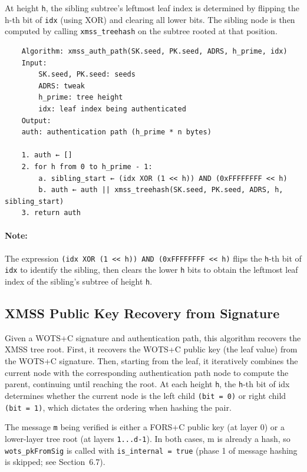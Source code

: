 At height \texttt{h}, the sibling subtree's leftmost leaf index is determined by flipping the h-th bit of \texttt{idx} (using XOR) and clearing all lower bits. The sibling node is then computed by calling \texttt{xmss\_treehash} on the subtree rooted at that position.
\begin{verbatim}
    Algorithm: xmss_auth_path(SK.seed, PK.seed, ADRS, h_prime, idx)
    Input:
        SK.seed, PK.seed: seeds
        ADRS: tweak
        h_prime: tree height
        idx: leaf index being authenticated
    Output:
    auth: authentication path (h_prime * n bytes)

    1. auth ← []
    2. for h from 0 to h_prime - 1:
        a. sibling_start ← (idx XOR (1 << h)) AND (0xFFFFFFFF << h)
        b. auth ← auth || xmss_treehash(SK.seed, PK.seed, ADRS, h, sibling_start)
    3. return auth
\end{verbatim}
\paragraph{Note:} The expression \texttt{(idx XOR (1 << h)) AND (0xFFFFFFFF << h)} flips the \texttt{h}-th bit of \texttt{idx} to identify the sibling, then clears the lower \texttt{h} bits to obtain the leftmost leaf index of the sibling's subtree of height \texttt{h}.

\subsection{XMSS Public Key Recovery from Signature}
Given a WOTS+C signature and authentication path, this algorithm recovers the XMSS tree root. First, it recovers the WOTS+C public key (the leaf value) from the WOTS+C signature. Then, starting from the leaf, it iteratively combines the current node with the corresponding authentication path node to compute the parent, continuing until reaching the root. At each height \texttt{h}, the \texttt{h}-th bit of idx determines whether the current node is the left child \texttt{(bit = 0)} or right child \texttt{(bit = 1)}, which dictates the ordering when hashing the pair.

The message \texttt{m} being verified is either a FORS+C public key (at layer 0) or a lower-layer tree root (at layers \texttt{1...d-1}). In both cases, m is already a hash, so \texttt{wots\_pkFromSig} is called with \texttt{is\_internal = true} (phase 1 of message hashing is skipped; see Section~6.7).

